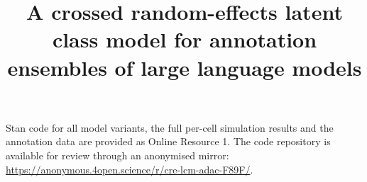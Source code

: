 \documentclass[pdflatex,sn-mathphys-ay]{sn-jnl}
\theoremstyle{thmstyleone}
\theoremstyle{thmstyletwo}
\theoremstyle{thmstylethree}
\begin{document}
\title[CRE-LCM for LLM annotation ensembles]{A crossed random-effects latent class model for annotation ensembles of large language models}

\author*[1]{ }

\abstract{}



\maketitle








\backmatter

Stan code for all model variants, the full per-cell simulation results and the annotation data are provided as Online Resource 1. The code repository is available for review through an anonymised mirror: \url{https://anonymous.4open.science/r/cre-lcm-adac-F89F/}.

\begin{appendices}


\end{appendices}


\end{document}
